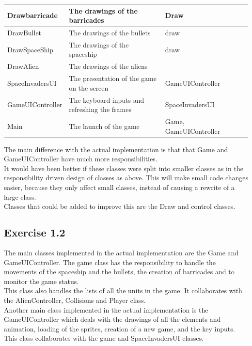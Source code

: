 \documentclass[10pt]{article}
\begin{document}
\begin{center}
\begin{tabular}{ | p{3cm} | p{5cm} | p{3cm} | p{2cm} | p{2cm} |}
  Drawbarricade & The drawings of the barricades & Draw & &  \\  \hline
  DrawBullet & The drawings of the bullets & draw & &  \\  \hline
  DrawSpaceShip & The drawings of the spaceship & draw & &  \\  \hline
  DrawAlien  & The drawings of the aliens & & &  \\  \hline
  SpaceInvadersUI & The presentation of the game on the screen & GameUIController & &  \\  \hline
  GameUIController & The keyboard inputs and refreshing the frames & SpaceInvadersUI & &  \\  \hline
  Main & The launch of the game & Game, GameUIController & &  \\  \hline
    \end{tabular}
\end{center}
\hfill\break
The main difference with the actual implementation is that that Game and GameUIController have much more responsibilities.\\
It would have been better if these classes were split into smaller classes as in the responsibility driven design of classes as above. This will make small code changes easier, because they only affect small classes, instead of causing a rewrite of a large class.\\ Classes that could be added to improve this are the Draw and control classes. 

\subsection*{Exercise 1.2}
The main classes implemented in the actual implementation are the Game and GameUIController.
The game class has the responsibility to handle the movements of the spaceship and the bullets, the creation of barricades and to monitor the game status.\\
This class also handles the lists of all the units in the game. It collaborates with the AlienController, Collisions and Player class. \\
Another main class implemented in the actual implementation is the GameUIController which deals with the drawings of all the elements and animation, loading of the sprites, creation of a new game,  and the key inputs. This class collaborates with the game and SpaceInvadersUI classes.\\
\end{document}
